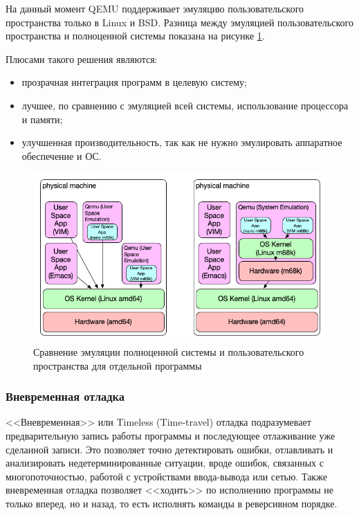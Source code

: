 На данный момент QEMU поддерживает эмуляцию пользовательского пространства только в Linux и BSD.
Разница между эмуляцией пользовательского пространства и полноценной системы показана на рисунке
\ref{fig:qemu-userspace}.

Плюсами такого решения являются:
\begin{itemize}
    \item прозрачная интеграция программ в целевую систему;
    \item лучшее, по сравнению с эмуляцией всей системы, использование процессора и памяти;
    \item улучшенная производительность, так как не нужно эмулировать аппаратное обеспечение и ОС.
\end{itemize}


\begin{figure}[!htbp]
    \centering
    \begin{adjustbox}{max totalsize={\textwidth}{\textheight}}
        \includegraphics[]{images/qemu-userspace.png}
    \end{adjustbox}
    \caption{Сравнение эмуляции полноценной системы и пользовательского пространства для отдельной программы}\label{fig:qemu-userspace}
\end{figure}


\subsubsection{Вневременная отладка}\label{sec:ch1/sec2/sub3/sub1}

<<Вневременная>> или Timeless (Time-travel) отладка подразумевает предварительную запись работы программы и
последующее отлаживание уже сделанной записи. Это позволяет точно детектировать ошибки, отлавливать и
анализировать недетерминированные ситуации, вроде ошибок, связанных с многопоточностью, работой с
устройствами ввода-вывода или сетью. Также вневременная отладка позволяет <<ходить>> по исполнению
программы не только вперед, но и назад, то есть исполнять команды в реверсивном порядке.


